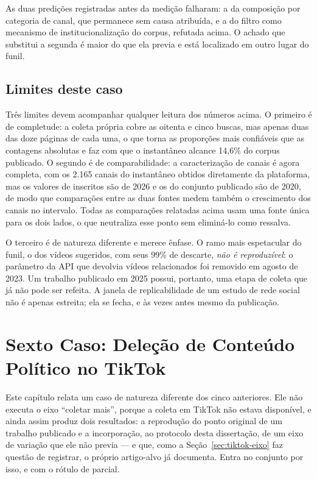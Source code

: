 As duas predições registradas antes da medição falharam: a da
composição por categoria de canal, que permanece sem causa atribuída, e a do filtro
como mecanismo de institucionalização do corpus, refutada acima. O achado que
substitui a segunda é maior do que ela previa e está localizado em outro lugar do
funil.

\section{Limites deste caso}

Três limites devem acompanhar qualquer leitura dos números acima. O primeiro é de
completude: a coleta própria cobre as oitenta e cinco buscas, mas apenas duas das doze
páginas de cada uma, o que torna as proporções mais confiáveis que as contagens
absolutas e faz com que o instantâneo alcance 14,6\% do corpus publicado. O segundo é
de comparabilidade: a caracterização de canais é agora completa, com os 2.165 canais
do instantâneo obtidos diretamente da plataforma, mas os valores de inscritos são de
2026 e os do conjunto publicado são de 2020, de modo que comparações entre as duas
fontes medem também o crescimento dos canais no intervalo. Todas as comparações
relatadas acima usam uma fonte única para os dois lados, o que neutraliza esse ponto
sem eliminá-lo como ressalva.

O terceiro é de natureza diferente e merece ênfase. O ramo mais espetacular do funil,
o dos vídeos sugeridos, com seus 99\% de descarte, \emph{não é reproduzível}: o
parâmetro da API que devolvia vídeos relacionados foi removido em agosto de 2023.
Um trabalho publicado em 2025 possui, portanto, uma etapa de coleta que já não pode
ser refeita. A janela de replicabilidade de um estudo de rede social não é apenas
estreita; ela se fecha, e às vezes antes mesmo da publicação.

\chapter{Sexto Caso: Deleção de Conteúdo Político no TikTok}
\label{cap:caso-tiktok}

Este capítulo relata um caso de natureza diferente dos cinco anteriores. Ele não
executa o eixo ``coletar mais'', porque a coleta em TikTok não estava disponível, e
ainda assim produz dois resultados: a reprodução do ponto original de um trabalho
publicado e a incorporação, ao protocolo desta dissertação, de um eixo de variação
que ele não previa --- e que, como a Seção~\ref{sec:tiktok-eixo} faz questão de
registrar, o próprio artigo-alvo já documenta. Entra no conjunto por isso, e com o
rótulo de parcial.

